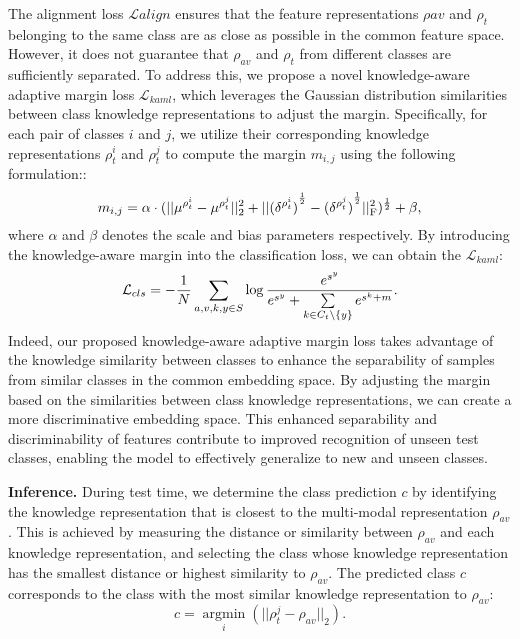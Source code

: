 \documentclass[10pt,twocolumn,letterpaper]{article}
\begin{document}
The alignment loss $\mathcal{L}{align}$ ensures that the feature representations $\rho{av}$ and $\rho_{t}$ belonging to the same class are as close as possible in the common feature space. However, it does not guarantee that $\rho_{av}$ and $\rho_{t}$ from different classes are sufficiently separated. To address this, we propose a novel knowledge-aware adaptive margin loss $\mathcal{L}_{kaml}$, which leverages the Gaussian distribution similarities between class knowledge representations to adjust the margin. Specifically, for each pair of classes $i$ and $j$, we utilize their corresponding knowledge representations $\rho_{t}^i$ and $\rho_{t}^j$ to compute the margin $m_{i,j}$ using the following formulation::
\begin{equation}
    m_{i,j} = \alpha \cdot (||\mu^{\rho^i_{t}}-\mu^{\rho^j_{t}}||^2_2+||{(\delta^{\rho^i_{t}})}^{\frac{1}{2}}-{(\delta^{\rho^j_{t}})}^{\frac{1}{2}}||^2_{\rm F})^{\frac{1}{2}} + \beta,
\end{equation}
where $\alpha$ and $\beta$ denotes the scale and bias parameters respectively. By introducing the knowledge-aware margin into the classification loss, we can obtain the $\mathcal{L}_{kaml}$:
\begin{equation}
    \mathcal{L}_{cls} = -\frac{1}{N} \sum_{{a,v,k,y}\in S} {\rm log}\,\frac{e^{s^y}}{e^{s^y}+\sum\limits_{k\in C_t \backslash \{y\} } e^{s^k+m}}.
\end{equation}
Indeed, our proposed knowledge-aware adaptive margin loss takes advantage of the knowledge similarity between classes to enhance the separability of samples from similar classes in the common embedding space. By adjusting the margin based on the similarities between class knowledge representations, we can create a more discriminative embedding space. This enhanced separability and discriminability of features contribute to improved recognition of unseen test classes, enabling the model to effectively generalize to new and unseen classes.



\noindent
\textbf{Inference.} 
During test time, we determine the class prediction $c$ by identifying the knowledge representation that is closest to the multi-modal representation $\rho_{av}$. This is achieved by measuring the distance or similarity between $\rho_{av}$ and each knowledge representation, and selecting the class whose knowledge representation has the smallest distance or highest similarity to $\rho_{av}$. The predicted class $c$ corresponds to the class with the most similar knowledge representation to $\rho_{av}$:
\begin{equation}
    c = \mathop{\arg\min}\limits_{i}(||\rho^j_{t}-\rho_{av}||_2).
\end{equation}
\end{document}
